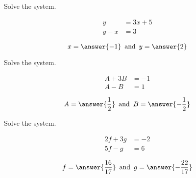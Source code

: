 \documentclass{ximera}
\author{Lee Wayand}
\begin{document}
\begin{exercise}








\begin{question} 


Solve the system.



\begin{align*}
y     & = 3 x + 5 \\
y - x & = 3
\end{align*}

\[
x = \answer{-1}  \,  \text{ and } \, y = \answer{2}
\]



\end{question}













\begin{question} 


Solve the system.



\begin{align*}
A + 3B     & = -1 \\
A - B & = 1
\end{align*}

\[
A = \answer{\frac{1}{2}}  \,  \text{ and } \, B = \answer{-\frac{1}{2}} 
\]


\end{question}











\begin{question} 


Solve the system.



\begin{align*}
2f + 3g     & = -2 \\
5f - g & = 6
\end{align*}

\[
f = \answer{\frac{16}{17}}  \,  \text{ and } \, g = \answer{-\frac{22}{17}} 
\]


\end{question}





\end{exercise}
\end{document}
